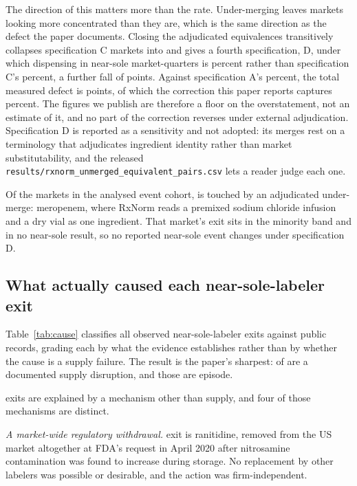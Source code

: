 \documentclass[pdflatex,sn-vancouver-num,Numbered]{sn-jnl}
\begin{document}
The direction of this matters more than the rate. Under-merging leaves markets looking more
concentrated than they are, which is the same direction as the defect the paper documents.
Closing the \nRxPairsClosed adjudicated equivalences transitively collapses \nSpecDIn
specification C markets into \nSpecDOut and gives a fourth specification, D, under which
dispensing in near-sole market-quarters is \nSpecDSoleVol percent rather than specification C's
\nNearSoleVolC percent, a further fall of \nSpecDDelta points. Against specification A's
\nNearSoleVolA percent, the total measured defect is \nSpecDTotal points, of which the correction
this paper reports captures \nSpecDShareOfTotal percent. The figures we publish are therefore a
floor on the overstatement, not an estimate of it, and no part of the correction reverses under
external adjudication. Specification D is reported as a sensitivity and not adopted: its merges
rest on a terminology that adjudicates ingredient identity rather than market substitutability,
and the released
\texttt{results/rxnorm\_unmerged\_equivalent\_pairs.csv} lets a reader judge each one.

Of the \nCohortMarkets markets in the analysed event cohort, \nRxCohortTouchedW is touched by an adjudicated
under-merge: meropenem, where RxNorm reads a premixed sodium chloride infusion and a dry vial
as one ingredient. That market's exit sits in the minority band and in no near-sole result, so
no reported near-sole event changes under specification D.

\subsection{What actually caused each near-sole-labeler exit}\label{subsec:causeres}

Table~\ref{tab:cause} classifies all \nCauseTotal observed near-sole-labeler exits against public
records, grading each by what the evidence establishes rather than by whether the cause is a
supply failure. The result is the paper's sharpest: \nCauseSupplyW of \nCauseTotal are a
documented supply disruption, and those \nCauseSupplyW are \nCauseSupplyEpisodes episode.

\nCauseExplainedUC exits are explained by a mechanism other than supply, and four of those
mechanisms are distinct.

\emph{A market-wide regulatory withdrawal.} \nCauseWithdrawalUC exit is ranitidine, removed from
the US market altogether at FDA's request in April 2020 after nitrosamine contamination was found
to increase during storage. No replacement by other labelers was possible or desirable, and the
action was firm-independent.
\end{document}
